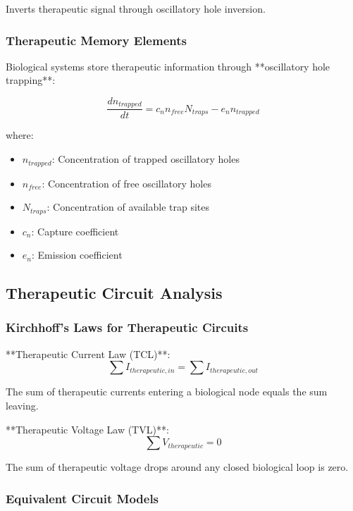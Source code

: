 Inverts therapeutic signal through oscillatory hole inversion.

\subsubsection{Therapeutic Memory Elements}

Biological systems store therapeutic information through **oscillatory hole trapping**:

\begin{equation}
\frac{dn_{trapped}}{dt} = c_n n_{free} N_{traps} - e_n n_{trapped}
\end{equation}

where:
\begin{itemize}
\item $n_{trapped}$: Concentration of trapped oscillatory holes
\item $n_{free}$: Concentration of free oscillatory holes  
\item $N_{traps}$: Concentration of available trap sites
\item $c_n$: Capture coefficient
\item $e_n$: Emission coefficient
\end{itemize}

\subsection{Therapeutic Circuit Analysis}

\subsubsection{Kirchhoff's Laws for Therapeutic Circuits}

**Therapeutic Current Law (TCL)**:
\begin{equation}
\sum I_{therapeutic,in} = \sum I_{therapeutic,out}
\end{equation}

The sum of therapeutic currents entering a biological node equals the sum leaving.

**Therapeutic Voltage Law (TVL)**:
\begin{equation}
\sum V_{therapeutic} = 0
\end{equation}

The sum of therapeutic voltage drops around any closed biological loop is zero.

\subsubsection{Equivalent Circuit Models}


